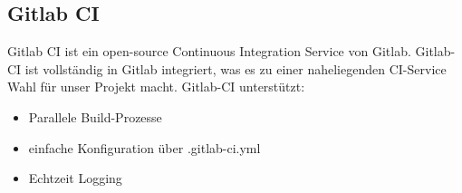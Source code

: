 \subsection{Gitlab CI}
Gitlab CI ist ein open-source Continuous Integration Service von Gitlab. Gitlab-CI ist vollständig in Gitlab integriert, was es zu einer naheliegenden CI-Service Wahl für unser Projekt macht.
Gitlab-CI unterstützt:
\begin{itemize}
	\item Parallele Build-Prozesse
	\item einfache Konfiguration über .gitlab-ci.yml
	\item Echtzeit Logging
\end{itemize}